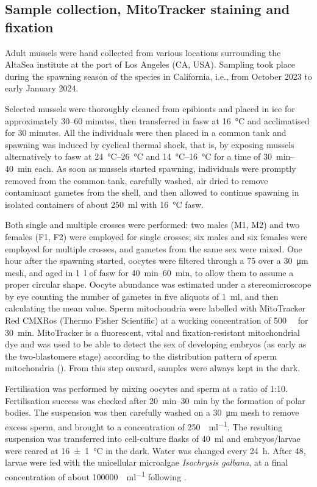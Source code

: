 \subsection{Sample collection, MitoTracker staining and fixation}
Adult mussels were hand collected from various locations surrounding the AltaSea institute at the port of Los Angeles (CA, USA). Sampling took place during the spawning season of the species in California, i.e., from October 2023 to early January 2024.

Selected mussels were thoroughly cleaned from epibionts and placed in ice for approximately 30--60 minutes, then transferred in \gls{fasw} at \qty{16}{\degreeCelsius} and acclimatised for 30 minutes. All the individuals were then placed in a common tank and spawning was induced by cyclical thermal shock, that is, by exposing mussels alternatively to \gls{fasw} at \qtyrange{24}{26}{\degreeCelsius} and \qtyrange{14}{16}{\degreeCelsius} for a time of \qtyrange{30}{40}{\minute} each. As soon as mussels started spawning, individuals were promptly removed from the common tank, carefully washed, air dried to remove contaminant gametes from the shell, and then allowed to continue spawning in isolated containers of about \qty{250}{\ml} with \qty{16}{\degreeCelsius} \gls{fasw}.

Both single and multiple crosses were performed: two males (M1, M2) and two females (F1, F2) were employed for single crosses; six males and six females were employed for multiple crosses, and gametes from the same sex were mixed. One hour after the spawning started, oocytes were filtered through a \num{75} over a \qty{30}{\um} mesh, and aged in \qty{1}{\l} of \gls{fasw} for \qtyrange{40}{60}{\minute}, to allow them to assume a proper circular shape. Oocyte abundance was estimated under a stereomicroscope by eye counting the number of gametes in five aliquots of \qty{1}{\ml}, and then calculating the mean value. Sperm mitochondria were labelled with MitoTracker Red CMXRos (Thermo Fisher Scientific) at a working concentration of \qty{500}{\nano\molar} for \qty{30}{\minute}. MitoTracker is a fluorescent, vital and fixation-resistant mitochondrial dye and was used to be able to detect the sex of developing embryos (as early as the two-blastomere stage) according to the distribution pattern of sperm mitochondria (). From this step onward, samples were always kept in the dark.

Fertilisation was performed by mixing oocytes and sperm at a ratio of 1:10. Fertilisation success was checked after \qtyrange{20}{30}{\minute} by the formation of polar bodies. The suspension was then carefully washed on a \qty{30}{\um} mesh to remove excess sperm, and brought to a concentration of \qty{250}{\zygotes\per\ml}. The resulting suspension was transferred into cell-culture flasks of \qty{40}{\ml} and embryos/larvae were reared at \qty{16(1)}{\degreeCelsius} in the dark. Water was changed every \qty{24}{\hour}. After \qty{48}{\hpf}, larvae were fed with the unicellular microalgae \textit{Isochrysis galbana}, at a final concentration of about \qty{100000}{\cells\per\ml} following .

